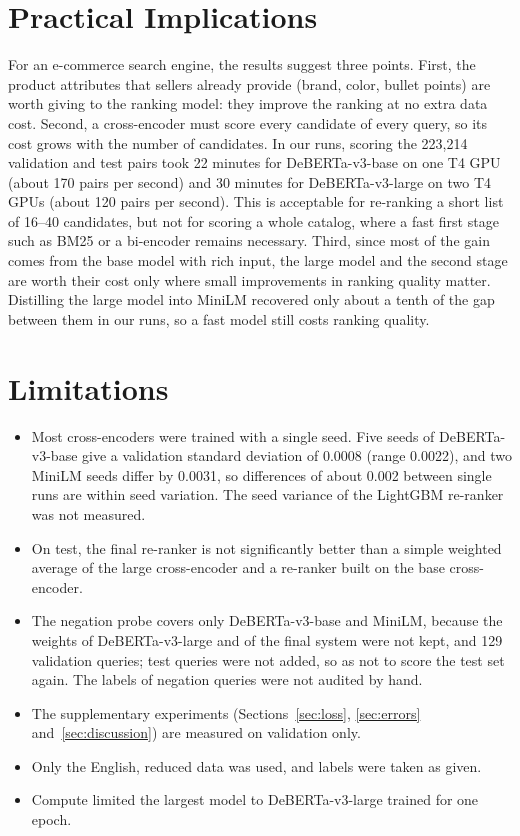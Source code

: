 \documentclass[12pt,a4paper]{report}
\begin{document}
\section{Practical Implications}
For an e-commerce search engine, the results suggest three points. First, the product attributes that sellers already provide (brand, color, bullet points) are worth giving to the ranking model: they improve the ranking at no extra data cost. Second, a cross-encoder must score every candidate of every query, so its cost grows with the number of candidates. In our runs, scoring the 223,214 validation and test pairs took 22 minutes for DeBERTa-v3-base on one T4 GPU (about 170 pairs per second) and 30 minutes for DeBERTa-v3-large on two T4 GPUs (about 120 pairs per second). This is acceptable for re-ranking a short list of 16--40 candidates, but not for scoring a whole catalog, where a fast first stage such as BM25 or a bi-encoder remains necessary. Third, since most of the gain comes from the base model with rich input, the large model and the second stage are worth their cost only where small improvements in ranking quality matter. Distilling the large model into MiniLM recovered only about a tenth of the gap between them in our runs, so a fast model still costs ranking quality.

\section{Limitations}
\begin{itemize}
  \item Most cross-encoders were trained with a single seed. Five seeds of DeBERTa-v3-base give a validation standard deviation of 0.0008 (range 0.0022), and two MiniLM seeds differ by 0.0031, so differences of about 0.002 between single runs are within seed variation. The seed variance of the LightGBM re-ranker was not measured.
  \item On test, the final re-ranker is not significantly better than a simple weighted average of the large cross-encoder and a re-ranker built on the base cross-encoder.
  \item The negation probe covers only DeBERTa-v3-base and MiniLM, because the weights of DeBERTa-v3-large and of the final system were not kept, and 129 validation queries; test queries were not added, so as not to score the test set again. The labels of negation queries were not audited by hand.
  \item The supplementary experiments (Sections~\ref{sec:loss}, \ref{sec:errors} and~\ref{sec:discussion}) are measured on validation only.
  \item Only the English, reduced data was used, and labels were taken as given.
  \item Compute limited the largest model to DeBERTa-v3-large trained for one epoch.
\end{itemize}
\end{document}
